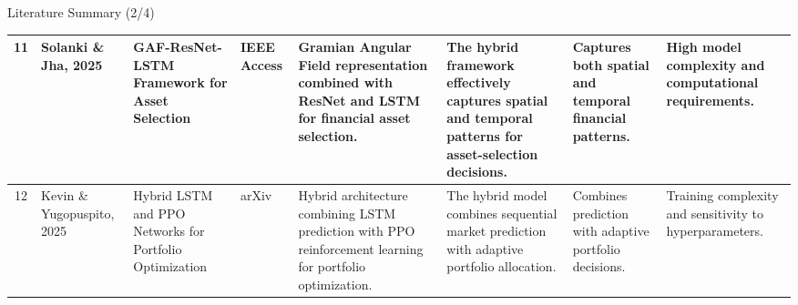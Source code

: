\documentclass{beamer}
\begin{document}
\begin{frame}{Literature Summary (2/4)}
{\begin{tabular}{c p{1.8cm} p{2.5cm} p{1.5cm} p{2.8cm} p{2.8cm} p{2.5cm} p{2.5cm}}
\midrule

11 &
Solanki \& Jha, 2025 &
GAF-ResNet-LSTM Framework for Asset Selection &
IEEE Access &
Gramian Angular Field representation combined with ResNet and LSTM for financial asset selection. &
The hybrid framework effectively captures spatial and temporal patterns for asset-selection decisions. &
Captures both spatial and temporal financial patterns. &
High model complexity and computational requirements. \\

\midrule

12 &
Kevin \& Yugopuspito, 2025 &
Hybrid LSTM and PPO Networks for Portfolio Optimization &
arXiv &
Hybrid architecture combining LSTM prediction with PPO reinforcement learning for portfolio optimization. &
The hybrid model combines sequential market prediction with adaptive portfolio allocation. &
Combines prediction with adaptive portfolio decisions. &
Training complexity and sensitivity to hyperparameters. \\

\bottomrule
\end{tabular}%
}

\end{frame}
\end{document}
